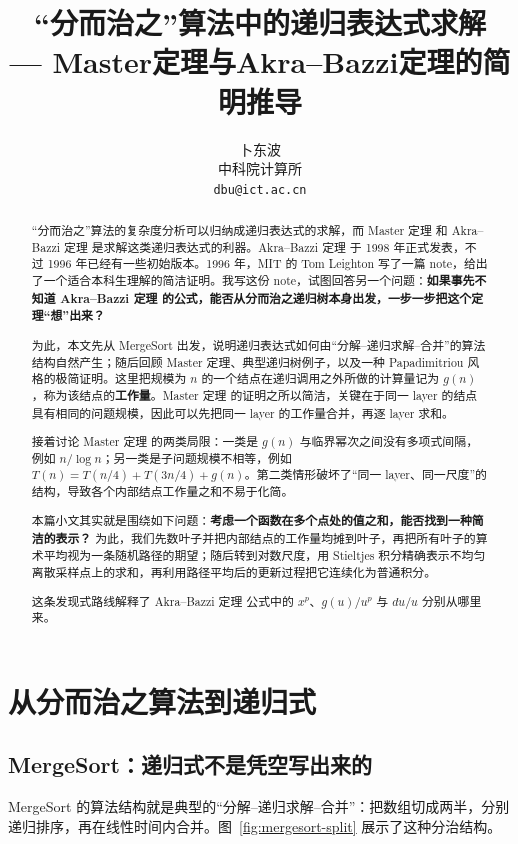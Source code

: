 \documentclass[11pt,a4paper]{article}
\title{\bfseries “分而治之”算法中的递归表达式求解\\[4pt]
\large\bfseries --- Master定理与Akra--Bazzi定理的简明推导}
\author{卜东波\\中科院计算所\\\texttt{dbu@ict.ac.cn}}
\date{}
\newcommand{\AB}{Akra--Bazzi 定理}
\newcommand{\Master}{Master 定理}
\begin{document}
\setlength{\parskip}{0.38em}
\renewcommand{\arraystretch}{1.20}
\setlength{\jot}{7pt}
\maketitle

\begin{abstract}
“分而治之”算法的复杂度分析可以归纳成递归表达式的求解，而 \Master{} 和 \AB{} 是求解这类递归表达式的利器。\AB{} 于 1998 年正式发表，不过 1996 年已经有一些初始版本。1996 年，MIT 的 Tom Leighton 写了一篇 note，给出了一个适合本科生理解的简洁证明。我写这份 note，试图回答另一个问题：\textbf{如果事先不知道 \AB{} 的公式，能否从分而治之递归树本身出发，一步一步把这个定理“想”出来？}

为此，本文先从 MergeSort 出发，说明递归表达式如何由“分解--递归求解--合并”的算法结构自然产生；随后回顾 \Master{}、典型递归树例子，以及一种 Papadimitriou 风格的极简证明。这里把规模为 $n$ 的一个结点在递归调用之外所做的计算量记为 $g(n)$，称为该结点的\textbf{工作量}。\Master{} 的证明之所以简洁，关键在于同一 layer 的结点具有相同的问题规模，因此可以先把同一 layer 的工作量合并，再逐 layer 求和。

接着讨论 \Master{} 的两类局限：一类是 $g(n)$ 与临界幂次之间没有多项式间隔，例如 $n/\log n$；另一类是子问题规模不相等，例如 $T(n)=T(n/4)+T(3n/4)+g(n)$。第二类情形破坏了“同一 layer、同一尺度”的结构，导致各个内部结点工作量之和不易于化简。

本篇小文其实就是围绕如下问题：\textbf{考虑一个函数在多个点处的值之和，能否找到一种简洁的表示？} 为此，我们先数叶子并把内部结点的工作量均摊到叶子，再把所有叶子的算术平均视为一条随机路径的期望；随后转到对数尺度，用 Stieltjes 积分精确表示不均匀离散采样点上的求和，再利用路径平均后的更新过程把它连续化为普通积分。

这条发现式路线解释了 \AB{} 公式中的 $x^p$、$g(u)/u^p$ 与 $du/u$ 分别从哪里来。
\end{abstract}

\section{从分而治之算法到递归式}

\subsection{MergeSort：递归式不是凭空写出来的}
MergeSort 的算法结构就是典型的“分解--递归求解--合并”：把数组切成两半，分别递归排序，再在线性时间内合并。图~\ref{fig:mergesort-split} 展示了这种分治结构。
\end{document}
